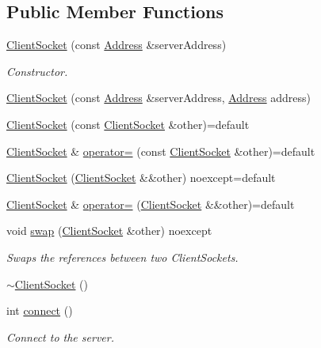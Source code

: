 \subsection*{Public Member Functions}
\begin{DoxyCompactItemize}
\item 
\hyperlink{classtnnf_1_1_client_socket_a2b7a6bce1c0caf339c260dfe2bb7265e}{Client\+Socket} (const \hyperlink{classtnnf_1_1_address}{Address} \&server\+Address)
\begin{DoxyCompactList}\small\item\em Constructor. \end{DoxyCompactList}\item 
\hyperlink{classtnnf_1_1_client_socket_ac6339f118f7f4f9854bcb736d3ee2e57}{Client\+Socket} (const \hyperlink{classtnnf_1_1_address}{Address} \&server\+Address, \hyperlink{classtnnf_1_1_address}{Address} address)
\item 
\hyperlink{classtnnf_1_1_client_socket_a597f62b7381bf35dfa2a972897459949}{Client\+Socket} (const \hyperlink{classtnnf_1_1_client_socket}{Client\+Socket} \&other)=default
\item 
\hyperlink{classtnnf_1_1_client_socket}{Client\+Socket} \& \hyperlink{classtnnf_1_1_client_socket_ad42dda3824a351a80135e43ee8ac5bfb}{operator=} (const \hyperlink{classtnnf_1_1_client_socket}{Client\+Socket} \&other)=default
\item 
\hyperlink{classtnnf_1_1_client_socket_a51affce1875948f4a1f6b51fdc3c2c27}{Client\+Socket} (\hyperlink{classtnnf_1_1_client_socket}{Client\+Socket} \&\&other) noexcept=default
\item 
\hyperlink{classtnnf_1_1_client_socket}{Client\+Socket} \& \hyperlink{classtnnf_1_1_client_socket_aa940a7f3d435ad59bffcc531f34e2ed4}{operator=} (\hyperlink{classtnnf_1_1_client_socket}{Client\+Socket} \&\&other)=default
\item 
void \hyperlink{classtnnf_1_1_client_socket_ad798fd02300826fe2dd15b6102f48cd3}{swap} (\hyperlink{classtnnf_1_1_client_socket}{Client\+Socket} \&other) noexcept
\begin{DoxyCompactList}\small\item\em Swaps the references between two Client\+Sockets. \end{DoxyCompactList}\item 
\hyperlink{classtnnf_1_1_client_socket_afa1e71789829627c1410e8b470d69023}{$\sim$\+Client\+Socket} ()
\item 
int \hyperlink{classtnnf_1_1_client_socket_a94d3333e52d1d18681b8098ceaca845c}{connect} ()
\begin{DoxyCompactList}\small\item\em Connect to the server. \end{DoxyCompactList}\end{DoxyCompactItemize}

